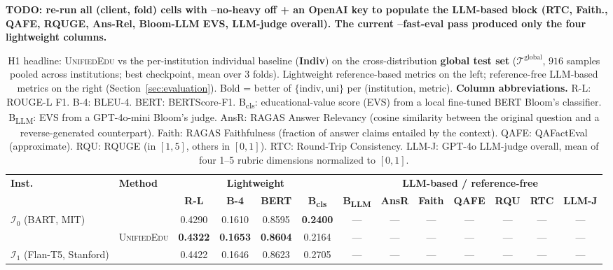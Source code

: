 \documentclass[11pt]{article}
\theoremstyle{plain}
\theoremstyle{definition}
\theoremstyle{remark}
\newcommand{\red}[1]{\textcolor{myred}{\textbf{#1}}}
\newcommand{\UniEdu}{\textsc{UnifiedEdu}}
\newcommand{\indiv}{\text{indiv}}
\newcommand{\uni}{\text{uni}}
\begin{document}
\red{TODO: re-run all (client, fold) cells with --no-heavy off + an OpenAI key to populate the LLM-based block (RTC, Faith., QAFE, RQUGE, Ans-Rel, Bloom-LLM EVS, LLM-judge overall). The current --fast-eval pass produced only the four lightweight columns.}
\begin{table}[t]
\centering
\footnotesize
\setlength{\tabcolsep}{2pt}
\caption{H1 headline: \UniEdu{} vs the per-institution
individual baseline (\textbf{Indiv}) on the
cross-distribution \textbf{global test set}
($\mathcal{T}^{\text{global}}$, $916$ samples
pooled across institutions; best checkpoint, mean
over 3 folds). Lightweight reference-based metrics
on the left; reference-free LLM-based metrics on
the right (Section~\ref{sec:evaluation}). Bold = better of
$\{\indiv, \uni\}$ per (institution, metric).
\textbf{Column abbreviations.} R-L: ROUGE-L F1.
B-4: BLEU-4. BERT: BERTScore-F1.
B\textsubscript{cls}: educational-value score
(EVS) from a local fine-tuned BERT Bloom's
classifier. B\textsubscript{LLM}: EVS from a
GPT-4o-mini Bloom's judge. AnsR: RAGAS Answer
Relevancy (cosine similarity between the original
question and a reverse-generated counterpart).
Faith: RAGAS Faithfulness (fraction of answer
claims entailed by the context). QAFE: QAFactEval
(approximate). RQU: RQUGE (in $[1,5]$, others in
$[0,1]$). RTC: Round-Trip Consistency. LLM-J:
GPT-4o LLM-judge overall, mean of four 1--5
rubric dimensions normalized to $[0,1]$.}
\label{tab:headline_global}
\begin{tabular}{ll cccc ccccccc}
\toprule
\multirow{2}{*}{\textbf{Inst.}} &
\multirow{2}{*}{\textbf{Method}} &
\multicolumn{4}{c}{\textbf{Lightweight}} &
\multicolumn{7}{c}{\textbf{LLM-based / reference-free}} \\
\cmidrule(lr){3-6} \cmidrule(lr){7-13}
& &
\textbf{R-L} & \textbf{B-4} & \textbf{BERT} & \textbf{B\textsubscript{cls}} &
\textbf{B\textsubscript{LLM}} & \textbf{AnsR} & \textbf{Faith} & \textbf{QAFE} &
\textbf{RQU} & \textbf{RTC} & \textbf{LLM-J} \\
\midrule
\multirow{2}{*}{$\mathcal{I}_0$ (BART, MIT)}
  & \indiv     & 0.4290 & 0.1610 & 0.8595 & \textbf{0.2400} & --- & --- & --- & --- & --- & --- & --- \\
  & \UniEdu{}  & \textbf{0.4322} & \textbf{0.1653} & \textbf{0.8604} & 0.2164 & --- & --- & --- & --- & --- & --- & --- \\
\midrule
\multirow{2}{*}{$\mathcal{I}_1$ (Flan-T5, Stanford)}
  & \indiv     & 0.4422 & 0.1646 & 0.8623 & 0.2705 & --- & --- & --- & --- & --- & --- & --- \\

\end{tabular}
\end{table}
\end{document}
